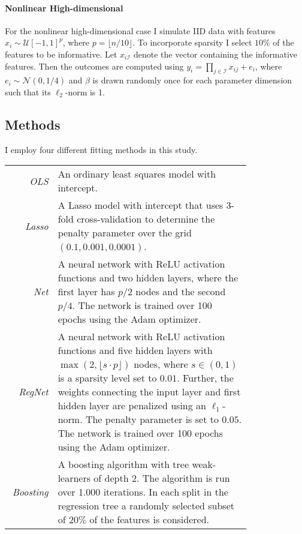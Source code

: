 \paragraph{Nonlinear High-dimensional}

For the nonlinear high-dimensional case I simulate IID data with features $x_i \sim
\mathcal{U}[-1, 1]^p$, where $p = \lfloor n / 10 \rfloor$. To incorporate sparsity I
select $10\%$ of the features to be informative. Let $x_{i\mathcal{I}}$ denote the
vector containing the informative features. Then the outcomes are computed using
$y_i = \prod_{j\in\mathcal{I}} x_{ij} + e_i$, where $e_i \sim \mathcal{N}(0, 1/4)$ and
$\beta$ is drawn randomly once for each parameter dimension such that its $\ell_2$-norm
is 1.


\subsection{Methods}

I employ four different fitting methods in this study.

\begin{center}
\begin{tabular}{r | p{0.8\linewidth}}
    \textit{OLS} & An ordinary least squares model with intercept. \\
    \textit{Lasso} & A Lasso model with intercept that uses $3$-fold cross-validation to
        determine the penalty parameter over the grid $(0.1, 0.001, 0.0001)$.  \\
    \textit{Net} & A neural network with ReLU activation functions and two hidden
        layers, where the first layer has $p/2$ nodes and the second $p/4$. The network
        is trained over 100 epochs using the Adam optimizer.  \\
    \textit{RegNet} & A neural network with ReLU activation functions and five hidden
        layers with $\max(2, \lfloor s \cdot p \rfloor)$ nodes, where $s \in (0, 1)$ is
        a sparsity level set to $0.01$. Further, the weights connecting the input layer
        and first hidden layer are penalized using an $\ell_1$-norm. The penalty
        parameter is set to $0.05$. The network is trained over 100 epochs using the
        Adam optimizer. \\
    \textit{Boosting} & A boosting algorithm with tree weak-learners of depth 2. The
        algorithm is run over 1.000 iterations. In each split in the regression tree
        a randomly selected subset of $20\%$ of the features is considered.
\end{tabular}
\end{center}

